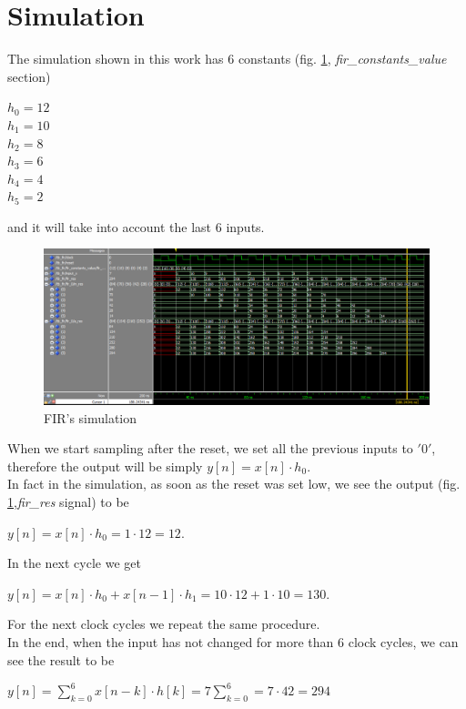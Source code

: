 \section{Simulation}
The simulation shown in this work has 6 constants (fig. \ref{fig:fir_sim}, \textit{fir\_constants\_value} section)
\begin{center}
	$ h_{0}=12$\\
	$h_{1}=10$\\
	$h_{2}= 8$\\
	$h_{3}= 6$\\
	$h_{4}= 4$\\
	$h_{5}= 2$\\
\end{center}
and it will take into account the last 6 inputs.\\
\begin{figure}[h!]
	\centering
	\includegraphics[width=\textwidth]{imm/fir/fir_sim.png}  
	\caption{FIR's simulation} 
	\label{fig:fir_sim}
\end{figure}
When we start sampling after the reset, we set all the previous inputs to $ '0' $, therefore the output will be simply $ y[n]=x[n]\cdot h_{0} $.\\
In fact in the simulation, as soon as the reset was set low, we see the output (fig. \ref{fig:fir_sim},\textit{fir\_res} signal) to be\begin{center}
	 $ y[n]=x[n]\cdot h_{0}=1\cdot12=12 $.
\end{center}
In the next cycle we get \begin{center}
	$ y[n]=x[n]\cdot h_{0}+x[n-1]\cdot h_{1}=10\cdot12+1\cdot 10=130 $.
\end{center}
For the next clock cycles we repeat the same procedure.\\
In the end, when the input has not changed for more than 6 clock cycles, we can see the result to be 
\begin{center}
	$ y[n]=\sum\limits_{k=0}^{6 } x[n-k]\cdot h[k]=7\sum\limits_{k=0}^{6 }=7\cdot42=294$
\end{center}
\clearpage
\newpage
